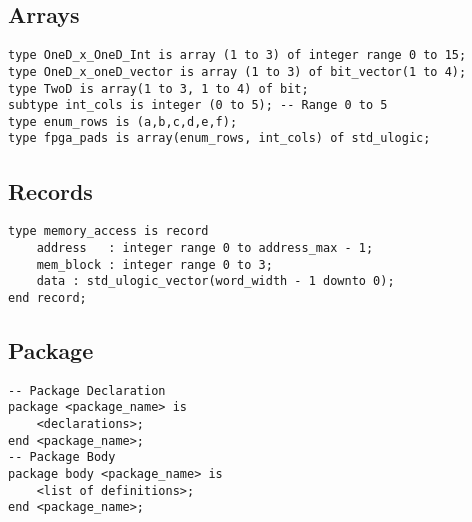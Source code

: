 \subsection{Arrays}
\begin{lstlisting}
type OneD_x_OneD_Int is array (1 to 3) of integer range 0 to 15;
type OneD_x_oneD_vector is array (1 to 3) of bit_vector(1 to 4);
type TwoD is array(1 to 3, 1 to 4) of bit;
subtype int_cols is integer (0 to 5); -- Range 0 to 5
type enum_rows is (a,b,c,d,e,f);
type fpga_pads is array(enum_rows, int_cols) of std_ulogic;
\end{lstlisting}
\vspace{-30pt}

\subsection{Records}
\begin{lstlisting}
type memory_access is record
	address   : integer range 0 to address_max - 1;
	mem_block : integer range 0 to 3;
	data : std_ulogic_vector(word_width - 1 downto 0);
end record;
\end{lstlisting}
\vspace{-30pt}


\subsection{Package}
\begin{lstlisting}
-- Package Declaration
package <package_name> is
	<declarations>;
end <package_name>;
-- Package Body
package body <package_name> is
	<list of definitions>;
end <package_name>;
\end{lstlisting}
\vspace{-30pt}
